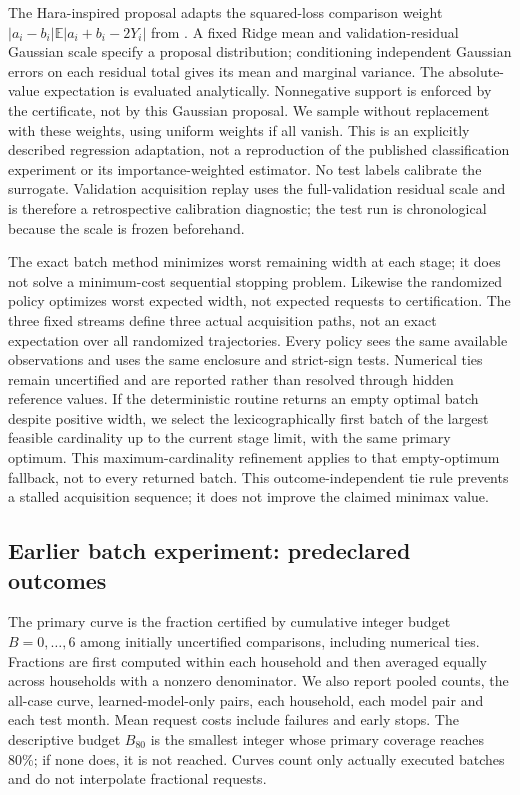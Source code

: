 \documentclass[12pt]{article}
\begin{document}
The Hara-inspired proposal adapts the squared-loss comparison weight
$|a_i-b_i|\mathbb{E}|a_i+b_i-2Y_i|$ from \cite{hara}. A fixed Ridge mean and
validation-residual Gaussian scale specify a proposal distribution;
conditioning independent Gaussian errors on each residual total gives its
mean and marginal variance. The absolute-value expectation is evaluated
analytically. Nonnegative support is enforced by the certificate, not by
this Gaussian proposal. We sample without replacement with these weights,
using uniform weights if all vanish. This is an explicitly described
regression adaptation, not a reproduction of the published classification
experiment or its importance-weighted estimator. No test labels calibrate
the surrogate. Validation acquisition replay uses the full-validation
residual scale and is therefore a retrospective calibration diagnostic;
the test run is chronological because the scale is frozen beforehand.

The exact batch method minimizes worst remaining width at each stage; it
does not solve a minimum-cost sequential stopping problem. Likewise the
randomized policy optimizes worst expected width, not expected requests to
certification. The three fixed streams define three actual acquisition
paths, not an exact expectation over all randomized trajectories. Every
policy sees the same available observations and uses the same enclosure and
strict-sign tests. Numerical ties remain uncertified and are reported rather
than resolved through hidden reference values.
If the deterministic routine returns an empty optimal batch despite positive
width, we select the lexicographically first batch of the largest feasible
cardinality up to the current stage limit, with the same primary optimum.
This maximum-cardinality refinement applies to that empty-optimum fallback,
not to every returned batch. This outcome-independent tie rule prevents a stalled
acquisition sequence; it does not improve the claimed minimax value.

\subsection{Earlier batch experiment: predeclared outcomes}\label{sec:external-metric}
The primary curve is the fraction certified by cumulative integer budget
$B=0,\ldots,6$ among initially uncertified comparisons, including numerical
ties. Fractions are first computed within each household and then averaged
equally across households with a nonzero denominator. We also report pooled
counts, the all-case curve, learned-model-only pairs, each household, each
model pair and each test month. Mean request costs include failures and
early stops. The descriptive budget $B_{80}$ is the smallest integer whose
primary coverage reaches 80\%; if none does, it is not reached. Curves count
only actually executed batches and do not interpolate fractional requests.
\end{document}
